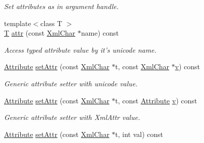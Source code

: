 \begin{DoxyCompactItemize}
\begin{DoxyCompactList}\small\item\em Set attributes as in argument handle. \item\end{DoxyCompactList}\item 
{\footnotesize template$<$class T $>$ }\\\hyperlink{class_t}{T} \hyperlink{class_d_d4hep_1_1_x_m_l_1_1_handle__t_abc9305bc2e0453a021dc9ef9d119843d}{attr} (const \hyperlink{namespace_d_d4hep_1_1_x_m_l_a09e5d9cc86ed782f6826dfe0778c1815}{XmlChar} $\ast$name) const 
\begin{DoxyCompactList}\small\item\em Access typed attribute value by it's unicode name. \item\end{DoxyCompactList}\item 
\hyperlink{namespace_d_d4hep_1_1_x_m_l_a5c19b7116be99d69b4b22d911357baaf}{Attribute} \hyperlink{class_d_d4hep_1_1_x_m_l_1_1_handle__t_a30ccb0db68774688528abd87bc065fbd}{setAttr} (const \hyperlink{namespace_d_d4hep_1_1_x_m_l_a09e5d9cc86ed782f6826dfe0778c1815}{XmlChar} $\ast$t, const \hyperlink{namespace_d_d4hep_1_1_x_m_l_a09e5d9cc86ed782f6826dfe0778c1815}{XmlChar} $\ast$\hyperlink{_multi_view_8cpp_a8320ee13ac034dbf6d624fe8953dd337}{v}) const 
\begin{DoxyCompactList}\small\item\em Generic attribute setter with unicode value. \item\end{DoxyCompactList}\item 
\hyperlink{namespace_d_d4hep_1_1_x_m_l_a5c19b7116be99d69b4b22d911357baaf}{Attribute} \hyperlink{class_d_d4hep_1_1_x_m_l_1_1_handle__t_abedae36966ec06e44f284236f0660ae9}{setAttr} (const \hyperlink{namespace_d_d4hep_1_1_x_m_l_a09e5d9cc86ed782f6826dfe0778c1815}{XmlChar} $\ast$t, const \hyperlink{namespace_d_d4hep_1_1_x_m_l_a5c19b7116be99d69b4b22d911357baaf}{Attribute} \hyperlink{_multi_view_8cpp_a8320ee13ac034dbf6d624fe8953dd337}{v}) const 
\begin{DoxyCompactList}\small\item\em Generic attribute setter with XmlAttr value. \item\end{DoxyCompactList}\item 
\hyperlink{namespace_d_d4hep_1_1_x_m_l_a5c19b7116be99d69b4b22d911357baaf}{Attribute} \hyperlink{class_d_d4hep_1_1_x_m_l_1_1_handle__t_afa15b5e7b6592b83dffc33106fe1d7d7}{setAttr} (const \hyperlink{namespace_d_d4hep_1_1_x_m_l_a09e5d9cc86ed782f6826dfe0778c1815}{XmlChar} $\ast$t, int val) const 

\end{DoxyCompactItemize}
